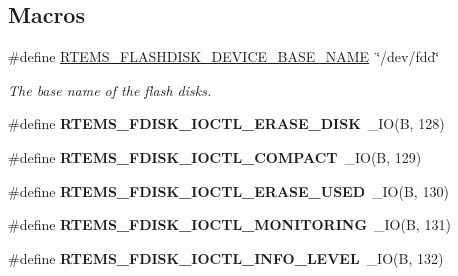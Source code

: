 \subsection*{Macros}
\begin{DoxyCompactItemize}
\item 
\mbox{\label{group__RTEMSFDisk_gaae3e325729c8176e749bb3cee3f253b7}} 
\#define \mbox{\hyperlink{group__RTEMSFDisk_gaae3e325729c8176e749bb3cee3f253b7}{R\+T\+E\+M\+S\+\_\+\+F\+L\+A\+S\+H\+D\+I\+S\+K\+\_\+\+D\+E\+V\+I\+C\+E\+\_\+\+B\+A\+S\+E\+\_\+\+N\+A\+ME}}~\char`\"{}/dev/fdd\char`\"{}
\begin{DoxyCompactList}\small\item\em The base name of the flash disks. \end{DoxyCompactList}\item 
\mbox{\label{group__RTEMSFDisk_gab70a76e49bc92d0459c36e251ac7995d}} 
\#define {\bfseries R\+T\+E\+M\+S\+\_\+\+F\+D\+I\+S\+K\+\_\+\+I\+O\+C\+T\+L\+\_\+\+E\+R\+A\+S\+E\+\_\+\+D\+I\+SK}~\+\_\+\+IO(\textquotesingle{}B\textquotesingle{}, 128)
\item 
\mbox{\label{group__RTEMSFDisk_gad44667818efd4cdd28a2c7f79d9db666}} 
\#define {\bfseries R\+T\+E\+M\+S\+\_\+\+F\+D\+I\+S\+K\+\_\+\+I\+O\+C\+T\+L\+\_\+\+C\+O\+M\+P\+A\+CT}~\+\_\+\+IO(\textquotesingle{}B\textquotesingle{}, 129)
\item 
\mbox{\label{group__RTEMSFDisk_ga480317177518e814f871a5e4eba798cf}} 
\#define {\bfseries R\+T\+E\+M\+S\+\_\+\+F\+D\+I\+S\+K\+\_\+\+I\+O\+C\+T\+L\+\_\+\+E\+R\+A\+S\+E\+\_\+\+U\+S\+ED}~\+\_\+\+IO(\textquotesingle{}B\textquotesingle{}, 130)
\item 
\mbox{\label{group__RTEMSFDisk_ga95b6cf04a54c5435797366bede6588a0}} 
\#define {\bfseries R\+T\+E\+M\+S\+\_\+\+F\+D\+I\+S\+K\+\_\+\+I\+O\+C\+T\+L\+\_\+\+M\+O\+N\+I\+T\+O\+R\+I\+NG}~\+\_\+\+IO(\textquotesingle{}B\textquotesingle{}, 131)
\item 
\mbox{\label{group__RTEMSFDisk_gaa45cdadec4be77c208d69008ad7f1c32}} 
\#define {\bfseries R\+T\+E\+M\+S\+\_\+\+F\+D\+I\+S\+K\+\_\+\+I\+O\+C\+T\+L\+\_\+\+I\+N\+F\+O\+\_\+\+L\+E\+V\+EL}~\+\_\+\+IO(\textquotesingle{}B\textquotesingle{}, 132)
\item 

\end{DoxyCompactItemize}
